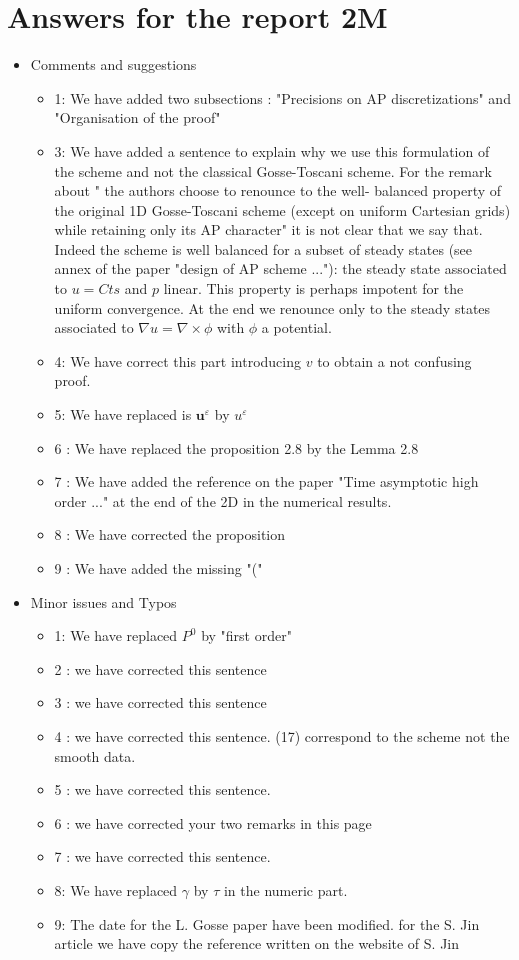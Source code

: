 \documentclass[a4paper,french,english,10pt]{article}
\newcommand{\eps}{\varepsilon}
\begin{document}
\section{Answers for the report 2M}
\begin{itemize}
\item Comments and suggestions
\begin{itemize}
\item 1: We have added two subsections : "Precisions on AP discretizations" and "Organisation of the proof"
\item 3: We have added a sentence to explain why we use this formulation of the scheme and not the classical Gosse-Toscani scheme. For the remark about " the authors choose to renounce to the well- balanced property of the original 1D Gosse-Toscani scheme (except on uniform Cartesian grids) while retaining only its AP character" it is not clear that we say that. Indeed the scheme is well balanced for a subset of steady states (see annex of the paper "design of AP scheme ..."): the steady state associated to $u=Cts$ and $p$ linear. This property is perhaps impotent for the uniform convergence. At the end we renounce only to the steady states associated to $\nabla{u}=\nabla\times \phi$ with $\phi$ a potential. 
\item 4: We have correct this part introducing $v$ to obtain a not confusing proof.
\item 5: We have replaced is $\mathbf{u}^{\eps}$ by $u^{\eps}$
\item 6 : We have replaced the proposition 2.8 by the Lemma 2.8
\item 7 : We have added the reference on the paper "Time asymptotic high order ..." at the end of the 2D in the numerical results.
\item 8 : We have corrected the proposition 
\item 9 : We have added the missing "("
\end{itemize}
\item Minor issues and Typos
\begin{itemize}
\item 1: We have replaced $P^0$ by "first order"
\item 2 : we have corrected this sentence 
\item 3 : we have corrected this sentence 
\item 4 : we have corrected this sentence. (17) correspond to the scheme not the smooth data.
\item 5 : we have corrected this sentence. 
\item 6 : we have corrected your two remarks in this page 
\item 7 : we have corrected this sentence. 
\item 8: We have replaced $\gamma$ by $\tau$ in the numeric part.
\item 9: The date for the L. Gosse paper have been modified. for the S. Jin article we have copy the reference written on the website of S. Jin 
\end{itemize}
\end{itemize}
\end{document}
